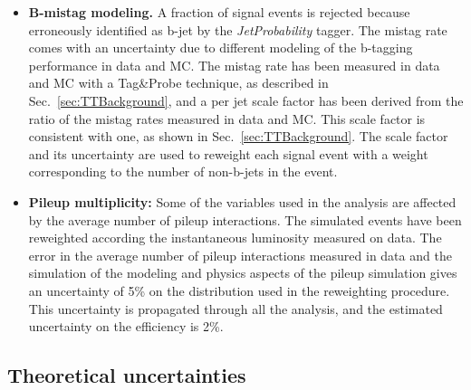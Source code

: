 \begin{itemize}
\item {\bf B-mistag modeling.}
     A fraction of signal events is rejected because erroneously identified as b-jet by the \textit{JetProbability} tagger.
     The mistag rate comes with an uncertainty due to different modeling of the b-tagging performance in data and MC.
     The mistag rate has been measured in data and MC with a Tag\&Probe technique, as described in Sec.~\ref{sec:TTBackground}, and a per jet scale factor has been derived from the ratio of the mistag rates measured in data and MC. This scale factor is consistent with one, as shown in Sec.~\ref{sec:TTBackground}. The scale factor and its uncertainty are used to reweight each signal event with a weight corresponding to the number of non-b-jets in the event. 


          
\item {\bf Pileup multiplicity:} Some of the variables used in the
  analysis are affected by the average number of pileup
  interactions. The simulated events have been reweighted according
  the instantaneous luminosity measured on data.
  The error in the average number of pileup interactions measured in data
  and the simulation of the modeling and physics aspects of the pileup simulation 
  gives an uncertainty of 5\% on the 
  distribution used in the reweighting procedure.
  This uncertainty is propagated through all
  the analysis, and the estimated uncertainty on the efficiency is 2\%.

\end{itemize}

\subsection{Theoretical uncertainties \label{subsec:thsyst}}

